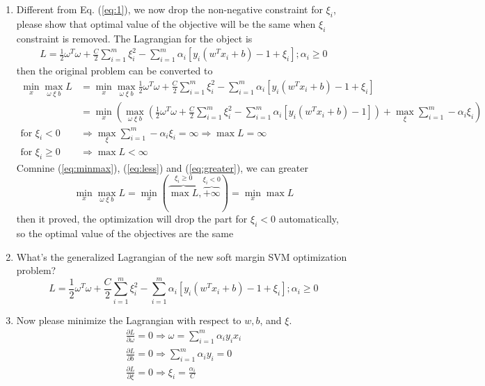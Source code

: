 \documentclass[11pt]{article}
\begin{document}
\begin{enumerate}
	\item Different from Eq. (\ref{eq:1}), we now drop the non-negative constraint for $\xi_i$, please show that optimal value of the objective will be the same when $\xi_i$ constraint is removed.
		The Lagrangian for the object is
		\begin{align}
			L = \frac{1}{2}\omega^T\omega+\frac{C}{2}\sum_{i=1}^{m}\xi_i^2-\sum_{i=1}^{m}\alpha_i[y_i(w^Tx_i + b) - 1 + \xi_i] ; \alpha_i\geq 0
		\end{align}
		then the original problem can be converted to 
		\begin{align}
			\min_{x}\max_{\omega\;\xi\;b}L &= \min_{x}\max_{\omega\;\xi\;b}\frac{1}{2}\omega^T\omega+\frac{C}{2}\sum_{i=1}^{m}\xi_i^2-\sum_{i=1}^{m}\alpha_i[y_i(w^Tx_i + b) - 1 + \xi_i]\\ \label{eq:minmax}
			&=\min_{x} \left( \max_{\omega\;\xi\;b}\left(\frac{1}{2}\omega^T\omega+
			\frac{C}{2}\sum_{i=1}^{m}\xi_i^2-\sum_{i=1}^{m}\alpha_i[y_i(w^Tx_i + b) - 1] \right) + \max_{\xi}\sum_{i=1}^{m}-\alpha_i\xi_i\right)
			\\
			\text{for } \xi_i<0 &\Rightarrow  \max_{\xi}\sum_{i=1}^{m}-\alpha_i\xi_i = \infty \Rightarrow \max L = \infty \label{eq:less} \\ 
			\text{for } \xi_i\geq 0 &\Rightarrow  \max L < \infty \label{eq:greater}
		\end{align}
		Comnine (\ref{eq:minmax}), (\ref{eq:less}) and (\ref{eq:greater}), we can greater
	\begin{equation}
			\min_{x}\max_{\omega\;\xi\;b}L  = \min_x\left( \overbrace{\max L}^{\xi_i\geq 0},\overbrace{+\infty}^{\xi_i<0}\right) = \min_x\max L
	\end{equation}
	then it proved, the optimization will drop the part for $\xi_i<0$ automatically, so the optimal value of the objectives are the same
	\item What's the generalized Lagrangian of the new soft margin SVM optimization problem?
		\begin{equation}
			L = \frac{1}{2}\omega^T\omega+\frac{C}{2}\sum_{i=1}^{m}\xi_i^2-\sum_{i=1}^{m}\alpha_i[y_i(w^Tx_i + b) - 1 + \xi_i] ; \alpha_i\geq 0
		\end{equation}
	\item Now please minimize the Lagrangian with respect to $w, b$, and $\xi$.
		\begin{align}
			\frac{\partial L}{\partial \omega} = 0 \Rightarrow \omega = \sum_{i=1}^{m}\alpha_i y_i x_i\\
			\frac{\partial L}{\partial b} = 0 \Rightarrow \sum_{i=1}^{m}\alpha_iy_i=0\\
			\frac{\partial L}{\partial \xi} = 0 \Rightarrow \xi_i=\frac{\alpha_i}{C}
		\end{align}
	

\end{enumerate}
\end{document}
